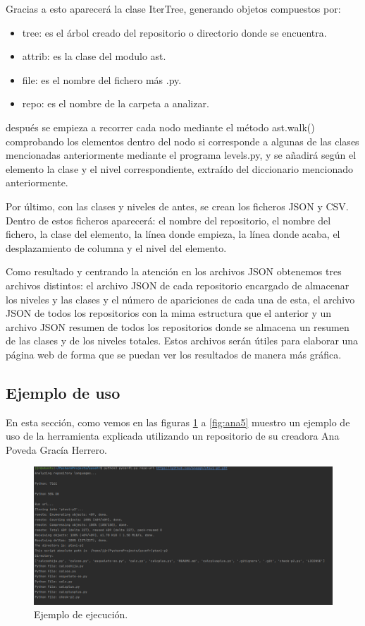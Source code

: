 \documentclass[a4paper, 12pt]{book}
\begin{document}
Gracias a esto aparecerá la clase IterTree, generando objetos compuestos por:

\begin{itemize}
	\item tree: es el árbol creado del repositorio o directorio donde se encuentra.
	\item attrib: es la clase del modulo ast.
	\item file: es el nombre del fichero más .py.
	\item repo: es el nombre de la carpeta a analizar.
\end{itemize}

después se empieza a recorrer cada nodo mediante el método ast.walk() comprobando los elementos dentro del nodo si corresponde a algunas de las clases mencionadas anteriormente mediante el programa levels.py, y se añadirá según el elemento la clase y el nivel correspondiente, extraído del diccionario mencionado anteriormente.

Por último, con las clases y niveles de antes, se crean los ficheros JSON y CSV. Dentro de estos ficheros aparecerá: el nombre del repositorio, el nombre del fichero, la clase del elemento, la línea donde empieza, la línea donde acaba, el desplazamiento de columna y el nivel del elemento.

Como resultado y centrando la atención en los archivos JSON obtenemos tres archivos distintos: el archivo JSON de cada repositorio encargado de almacenar los niveles y las clases y el número de apariciones de cada una de esta, el archivo JSON de todos los repositorios con la mima estructura que el anterior y un archivo JSON resumen de todos los repositorios donde se almacena un resumen de las clases y de los niveles totales. Estos archivos serán útiles para elaborar una página web de forma que se puedan ver los resultados de manera más gráfica.

\subsection{Ejemplo de uso}

En esta sección, como vemos en las figuras \ref{fig:ana1} a \ref{fig:ana5} muestro un ejemplo de uso de la herramienta explicada utilizando un repositorio de su creadora Ana Poveda Gracía Herrero.

\begin{figure}
  \centering
  \includegraphics[width=1\textwidth]{img/ejemplousoana1.png}
  \caption{Ejemplo de ejecución.}\label{fig:ana1}
\end{figure}
\end{document}
